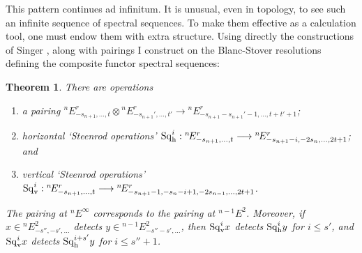 \documentclass[11pt]{article}
\theoremstyle{plain}
\newtheorem{theorem}{Theorem}
\renewcommand*{\thetheorem}{\Alph{theorem}}
\newcommand{\Sq}{\mathrm{Sq}}
\begin{document}



This pattern continues ad infinitum. It is unusual, even in topology, to see such an infinite sequence of spectral sequences. To make them effective as a calculation tool, one must endow them with extra structure. Using directly the constructions of Singer \cite{SingerSteen1.pdf}, along with pairings I construct on the Blanc-Stover resolutions defining the composite functor spectral sequences:
{
\renewcommand{\thetheorem}{\ref{CompFuncMasterDiag}.B}
\begin{theorem}
There are operations
\begin{enumerate}\squishlist
\setlength{\parindent}{.25in}
\item a pairing ${^{n\!}}E^r_{-s_{n+1},\ldots,t}\otimes {^{n\!}}E^r_{-s_{n+1}',\ldots,t'}\to {^{n\!}}E^r_{-s_{n+1}-s_{n+1}'-1,\ldots,t+t'+1}$;
\item horizontal `Steenrod operations' ${\Sq}^i_\textup{h}:{^{n\!}}E^r_{-s_{n+1},\ldots,t}\to {^{n\!}}E^r_{-s_{n+1}-i,-2s_{n},\ldots,2t+1}$; and
\item vertical `Steenrod operations' ${\Sq}^i_\textup{v}:{^{n\!}}E^r_{-s_{n+1},\ldots,t}\to {^{n\!}}E^r_{-s_{n+1}-1,-s_{n}-i+1,-2s_{n-1},\ldots,2t+1}$.
\end{enumerate}
The pairing at ${^{n\!}}E^\infty$ corresponds to the pairing at ${^{n-1\!}}E^2$. Moreover, if $x\in {^{n\!}}E^2_{-s'',-s',\ldots}$ detects $y\in {^{n-1\!}}E^2_{-s''-s',\ldots}$, then $\Sq_\textup{v}^ix$ detects $\Sq_\textup{h}^iy$ for $i\leq s'$, and $\Sq_\textup{v}^ix$ detects $\Sq_\textup{h}^{i+s'}y$ for $i\leq s''+1$.
\end{theorem}
}
\end{document}
